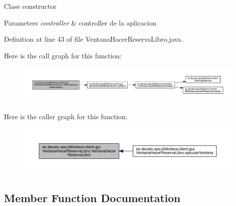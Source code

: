 Clase constructor 
\begin{DoxyParams}{Parameters}
{\em controller} & controller de la aplicacion \\
\hline
\end{DoxyParams}


Definition at line 43 of file Ventana\+Hacer\+Reserva\+Libro.\+java.

Here is the call graph for this function\+:
\nopagebreak
\begin{figure}[H]
\begin{center}
\leavevmode
\includegraphics[width=350pt]{classes_1_1deusto_1_1spq_1_1biblioteca_1_1client_1_1gui_1_1_ventana_hacer_reserva_libro_a2051a98a4c3b510430ea940cb77581e3_cgraph}
\end{center}
\end{figure}
Here is the caller graph for this function\+:
\nopagebreak
\begin{figure}[H]
\begin{center}
\leavevmode
\includegraphics[width=350pt]{classes_1_1deusto_1_1spq_1_1biblioteca_1_1client_1_1gui_1_1_ventana_hacer_reserva_libro_a2051a98a4c3b510430ea940cb77581e3_icgraph}
\end{center}
\end{figure}


\subsection{Member Function Documentation}
\mbox{\label{classes_1_1deusto_1_1spq_1_1biblioteca_1_1client_1_1gui_1_1_ventana_hacer_reserva_libro_ad2b020fc4a4ef8fb18848f75c31836e7}} 

